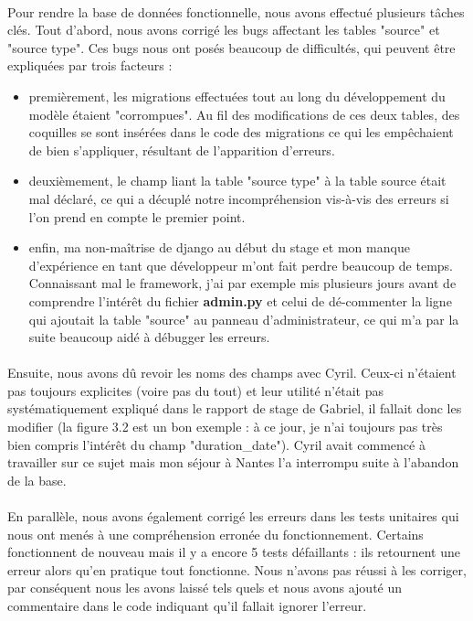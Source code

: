 \paragraph{} \hspace{10mm}
Pour rendre la base de données fonctionnelle, nous avons effectué plusieurs tâches clés. Tout d'abord, nous avons corrigé les bugs affectant les tables "source" et "source type". Ces bugs nous ont posés beaucoup de difficultés, qui peuvent être expliquées par trois facteurs :
\begin{itemize}
    \item[\ding{103}] premièrement, les migrations effectuées tout au long du développement du modèle étaient "corrompues". Au fil des modifications de ces deux tables, des coquilles se sont insérées dans le code des migrations ce qui les empêchaient de bien s'appliquer, résultant de l'apparition d'erreurs.
    \item[\ding{103}] deuxièmement, le champ liant la table "source type" à la table source était mal déclaré, ce qui a décuplé notre incompréhension vis-à-vis des erreurs si l'on prend en compte le premier point.
    \item[\ding{103}] enfin, ma non-maîtrise de django au début du stage et mon manque d'expérience en tant que développeur m'ont fait perdre beaucoup de temps. Connaissant mal le framework, j'ai par exemple mis plusieurs jours avant de comprendre l'intérêt du fichier \textbf{admin.py} et celui de dé-commenter la ligne qui ajoutait la table "source" au panneau d'administrateur, ce qui m'a par la suite beaucoup aidé à débugger les erreurs.  
\end{itemize}
\paragraph{} \hspace{10mm}
Ensuite, nous avons dû revoir les noms des champs avec Cyril. Ceux-ci n'étaient pas toujours explicites (voire pas du tout) et leur utilité n'était pas systématiquement expliqué dans le rapport de stage de Gabriel, il fallait donc les modifier (la figure 3.2 est un bon exemple : à ce jour, je n'ai toujours pas très bien compris l'intérêt du champ "duration\_date"). Cyril avait commencé à travailler sur ce sujet mais mon séjour à Nantes l'a interrompu suite à l'abandon de la base.
\paragraph{} \hspace{10mm}
En parallèle, nous avons également corrigé les erreurs dans les tests unitaires qui nous ont menés à une compréhension erronée du fonctionnement. Certains fonctionnent de nouveau mais il y a encore 5 tests défaillants : ils retournent une erreur alors qu'en pratique tout fonctionne. Nous n'avons pas réussi à les corriger, par conséquent nous les avons laissé tels quels et nous avons ajouté un commentaire dans le code indiquant qu'il fallait ignorer l'erreur.


